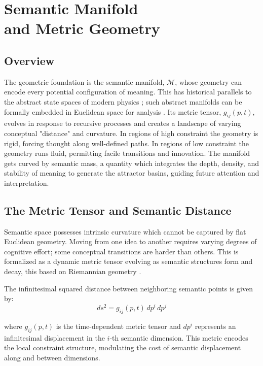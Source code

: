 \chapter{Semantic Manifold \\ and Metric Geometry}

\section{Overview}

The geometric foundation is the semantic manifold, \(\mathcal{M}\), whose geometry can encode every potential configuration of meaning. This has historical parallels to the abstract state spaces of modern physics \autocite{vonNeumann1932}; such abstract manifolds can be formally embedded in Euclidean space for analysis \autocite{Whitney1936}. Its metric tensor, \(g_{ij}(p, t)\), evolves in response to recursive processes and creates a landscape of varying conceptual "distance" and curvature. In regions of high constraint the geometry is rigid, forcing thought along well-defined paths. In regions of low constraint the geometry runs fluid, permitting facile transitions and innovation. The manifold gets curved by semantic mass, a quantity which integrates the depth, density, and stability of meaning to generate the attractor basins, guiding future attention and interpretation.

\section{The Metric Tensor and Semantic Distance}

Semantic space possesses intrinsic curvature which cannot be captured by flat Euclidean geometry. Moving from one idea to another requires varying degrees of cognitive effort; some conceptual transitions are harder than others. This is formalized as a dynamic metric tensor evolving as semantic structures form and decay, this based on Riemannian geometry \autocite{Riemann1868, doCarmo1992, Lee2003}.

The infinitesimal squared distance between neighboring semantic points is given by:
\begin{equation}
ds^2 = g_{ij}(p, t) \, dp^i \, dp^j
\end{equation}

where \(g_{ij}(p, t)\) is the time-dependent metric tensor and \(dp^i\) represents an infinitesimal displacement in the \(i\)-th semantic dimension. This metric encodes the local constraint structure, modulating the cost of semantic displacement along and between dimensions.

